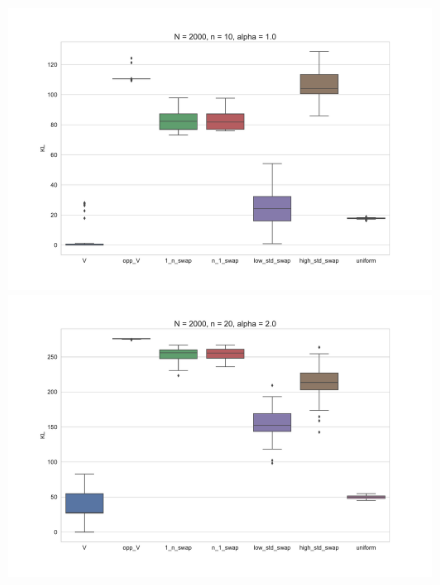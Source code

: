 \documentclass[11pt, oneside]{article}   	%
\begin{document}
\begin{figure}[h!]
		\begin{minipage}[t]{.45\textwidth}
			\centering
			\includegraphics[width=\textwidth]{figures/theorem2_2/N2000n10alpha1.pdf}
			
		\end{minipage}
		\hfill
		\begin{minipage}[t]{.45\textwidth}
			\centering
			\includegraphics[width=\textwidth]{figures/theorem2_2/N2000n20alpha2.pdf}
			
		\end{minipage} 

	
	

\end{figure}
\end{document}
